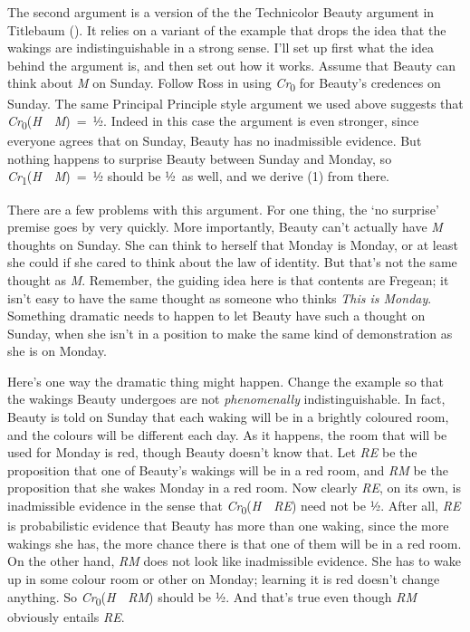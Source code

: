 \documentclass[
  11pt,
  letterpaper,
  DIV=11,
  numbers=noendperiod,
  twoside]{scrartcl}
\begin{document}
The second argument is a version of the the Technicolor Beauty argument
in Titlebaum (). It relies on a
variant of the example that drops the idea that the wakings are
indistinguishable in a strong sense. I'll set up first what the idea
behind the argument is, and then set out how it works. Assume that
Beauty can think about \emph{M} on Sunday. Follow Ross in using
\emph{Cr}\textsubscript{0} for Beauty's credences on Sunday. The same
Principal Principle style argument we used above suggests that
\emph{Cr}\textsubscript{0}(\emph{H}~\textbar~\emph{M})~=~½. Indeed in
this case the argument is even stronger, since everyone agrees that on
Sunday, Beauty has no inadmissible evidence. But nothing happens to
surprise Beauty between Sunday and Monday, so
\emph{Cr}\textsubscript{1}(\emph{H}~\textbar~\emph{M})~=~½ should be
½~as well, and we derive (1) from there.

There are a few problems with this argument. For one thing, the `no
surprise' premise goes by very quickly. More importantly, Beauty can't
actually have \emph{M} thoughts on Sunday. She can think to herself that
Monday is Monday, or at least she could if she cared to think about the
law of identity. But that's not the same thought as \emph{M}. Remember,
the guiding idea here is that contents are Fregean; it isn't easy to
have the same thought as someone who thinks \emph{This is Monday}.
Something dramatic needs to happen to let Beauty have such a thought on
Sunday, when she isn't in a position to make the same kind of
demonstration as she is on Monday.

Here's one way the dramatic thing might happen. Change the example so
that the wakings Beauty undergoes are not \emph{phenomenally}
indistinguishable. In fact, Beauty is told on Sunday that each waking
will be in a brightly coloured room, and the colours will be different
each day. As it happens, the room that will be used for Monday is red,
though Beauty doesn't know that. Let \emph{RE} be the proposition that
one of Beauty's wakings will be in a red room, and \emph{RM} be the
proposition that she wakes Monday in a red room. Now clearly \emph{RE},
on its own, is inadmissible evidence in the sense that
\emph{Cr}\textsubscript{0}(\emph{H}~\textbar~\emph{RE}) need not be ½.
After all, \emph{RE} is probabilistic evidence that Beauty has more than
one waking, since the more wakings she has, the more chance there is
that one of them will be in a red room. On the other hand, \emph{RM}
does not look like inadmissible evidence. She has to wake up in some
colour room or other on Monday; learning it is red doesn't change
anything. So \emph{Cr}\textsubscript{0}(\emph{H}~\textbar~\emph{RM})
should be ½. And that's true even though \emph{RM} obviously entails
\emph{RE}.
\end{document}
